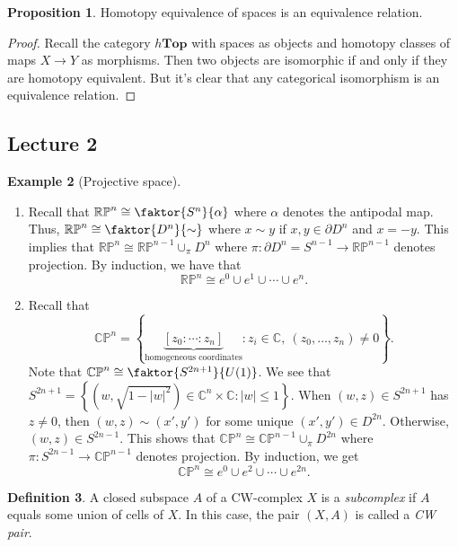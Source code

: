 \documentclass[10pt,letterpaper,cm]{nupset}
\theoremstyle{definition}
\newtheorem{definition}{Definition}[subsection]
\newtheorem{exmp}[definition]{Example}
\theoremstyle{theorem}
\newtheorem{prop}[definition]{Proposition}
\theoremstyle{remark}
\newcommand{\C}{\mathbb C}
\newcommand{\CP}{\mathbb{CP}}
\newcommand{\RP}{\mathbb{RP}}
\newcommand{\1}{\mathbb{1}}
\newcommand{\0}{\vec 0}
\begin{document}
\begin{prop}
Homotopy equivalence of spaces is an equivalence relation.
\end{prop}
\begin{proof}
Recall the category $h\mathbf{Top}$ with spaces as objects and homotopy classes of maps $X \to Y$ as morphisms. Then two objects are isomorphic if and only if they are homotopy equivalent. But it's clear that any categorical isomorphism is an equivalence relation.  
\end{proof}

\subsection{Lecture 2}

\begin{exmp}[Projective space]
\begin{enumerate}
\item Recall that $\RP^n \cong \faktor{S^n}{\alpha}$ where $\alpha$ denotes the antipodal map. Thus, $\RP^n \cong \faktor{D^n}{\sim}$ where $x\sim y$ if $x,y\in \partial{D^n}$ and $x={-y}$. This implies that $\RP^n \cong \RP^{n-1} \cup_{\pi} D^n$ where $\pi : \partial{D^n} = S^{n-1} \to \RP^{n-1}$ denotes projection. By induction, we have that $$\RP^n \cong e^0 \cup e^1 \cup \cdots \cup e^n.$$
\item Recall that $$\CP^n = \left\{\underbrace{[z_0 : \cdots : z_n]}_{\text{homogeneous coordinates}} : z_i \in \C, \ (z_0, \ldots, z_n) \ne 0\right\}.$$ Note that $\CP^n \cong \faktor{S^{2n+1}}{U(1)}$.
We see that $S^{2n+1} = \left\{(w, \sqrt{1-\left\lvert{w}\right\rvert^2}) \in \C^n \times \C : \left\lvert{w}\right\rvert \leq 1\right\}$. When $(w,z) \in S^{2n+1}$ has $z\ne 0$, then $(w,z) \sim (x', y')$ for some unique $(x', y')\in D^{2n}$. Otherwise, $(w,z) \in S^{2n-1}$. This shows that $\CP^n \cong \CP^{n-1} \cup_{\pi} D^{2n}$ where $\pi : S^{2n-1} \to \CP^{n-1}$ denotes projection.  By induction, we get $$\CP^n \cong e^0 \cup e^2 \cup \cdots \cup e^{2n}.$$
\end{enumerate}
\end{exmp}

\begin{definition}
A closed subspace $A$ of a CW-complex $X$ is a \textit{subcomplex} if $A$ equals some union of cells of $X$. In this case, the pair $(X, A)$ is called a \textit{CW pair}.
\end{definition}
\end{document}
